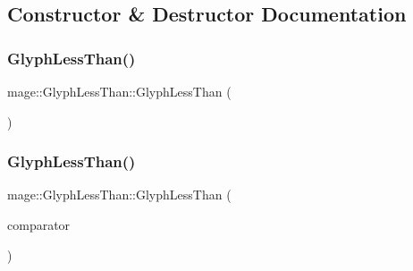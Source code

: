 \subsection{Constructor \& Destructor Documentation}
\hypertarget{structmage_1_1_glyph_less_than_a2ad76294131749c19d83b6f92c74f1dc}{}\label{structmage_1_1_glyph_less_than_a2ad76294131749c19d83b6f92c74f1dc} 
\subsubsection{\texorpdfstring{Glyph\+Less\+Than()}{GlyphLessThan()}\hspace{0.1cm}{\footnotesize\ttfamily [1/3]}}
{\footnotesize\ttfamily mage\+::\+Glyph\+Less\+Than\+::\+Glyph\+Less\+Than (\begin{DoxyParamCaption}{ }\end{DoxyParamCaption})\hspace{0.3cm}{\ttfamily [default]}}

\hypertarget{structmage_1_1_glyph_less_than_a27fc34d9db41ebba7a7b40864837e7e7}{}\label{structmage_1_1_glyph_less_than_a27fc34d9db41ebba7a7b40864837e7e7} 
\subsubsection{\texorpdfstring{Glyph\+Less\+Than()}{GlyphLessThan()}\hspace{0.1cm}{\footnotesize\ttfamily [2/3]}}
{\footnotesize\ttfamily mage\+::\+Glyph\+Less\+Than\+::\+Glyph\+Less\+Than (\begin{DoxyParamCaption}\item[{const \hyperlink{structmage_1_1_glyph_less_than}{Glyph\+Less\+Than} \&}]{comparator }\end{DoxyParamCaption})\hspace{0.3cm}{\ttfamily [default]}}

\hypertarget{structmage_1_1_glyph_less_than_ae41c3b9b7ecf202b5518f911342e170c}{}\label{structmage_1_1_glyph_less_than_ae41c3b9b7ecf202b5518f911342e170c} 
